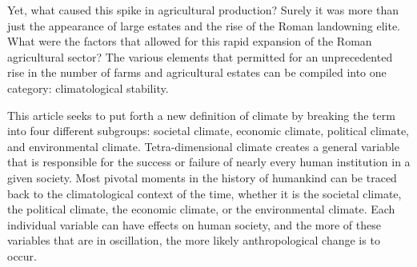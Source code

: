 	Yet, what caused this spike in agricultural production? Surely it was more than just the appearance of large estates and the rise of the Roman landowning elite. What were the factors that allowed for this rapid expansion of the Roman agricultural sector? The various elements that permitted for an unprecedented rise in the number of farms and agricultural estates can be compiled into one category: climatological stability. 

	This article seeks to put forth a new definition of climate by breaking the term into four different subgroups: societal climate, economic climate, political climate, and environmental climate. Tetra-dimensional climate creates a general variable that is responsible for the success or failure of nearly every human institution in a given society. Most pivotal moments in the history of humankind can be traced back to the climatological context of the time, whether it is the societal climate, the political climate, the economic climate, or the environmental climate. Each individual variable can have effects on human society, and the more of these variables that are in oscillation, the more likely anthropological change is to occur. 
	
